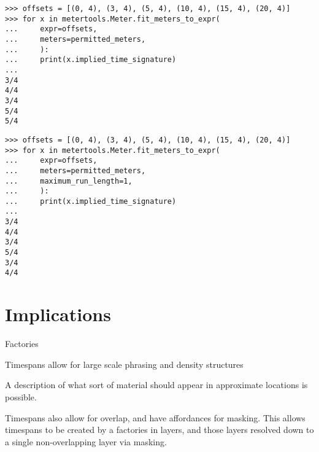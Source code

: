 \begin{singlespacing}
\vspace{-0.5\baselineskip}
\begin{lstlisting}
>>> offsets = [(0, 4), (3, 4), (5, 4), (10, 4), (15, 4), (20, 4)]
>>> for x in metertools.Meter.fit_meters_to_expr(
...     expr=offsets,
...     meters=permitted_meters,
...     ):
...     print(x.implied_time_signature)
...
3/4
4/4
3/4
5/4
5/4
\end{lstlisting}
\end{singlespacing}

\begin{comment}
<abjad>
offsets = [(0, 4), (3, 4), (5, 4), (10, 4), (15, 4), (20, 4)]
for x in metertools.Meter.fit_meters_to_expr(
    expr=offsets,
    meters=permitted_meters,
    maximum_run_length=1,
    ):
    print(x.implied_time_signature)

</abjad>
\end{comment}

\begin{singlespacing}
\vspace{-0.5\baselineskip}
\begin{lstlisting}
>>> offsets = [(0, 4), (3, 4), (5, 4), (10, 4), (15, 4), (20, 4)]
>>> for x in metertools.Meter.fit_meters_to_expr(
...     expr=offsets,
...     meters=permitted_meters,
...     maximum_run_length=1,
...     ):
...     print(x.implied_time_signature)
...
3/4
4/4
3/4
5/4
3/4
4/4
\end{lstlisting}
\end{singlespacing}

\section{Implications}

Factories

Timespans allow for large scale phrasing and density structures

A description of what sort of material should appear in approximate locations
is possible.

Timespans also allow for overlap, and have affordances for masking. This allows
timespans to be created by a factories in layers, and those layers resolved
down to a single non-overlapping layer via masking.